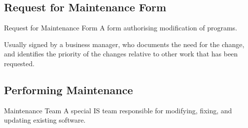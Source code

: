 \documentclass[\main/notes.tex]{subfiles}
\begin{document}
			\subsection{Request for Maintenance Form}
				\begin{definition}{Request for Maintenance Form}
					A form authorising modification of programs.

					Usually signed by a business manager, who documents the need for the change, and identifies the priority of the changes relative to other work that has been requested.
				\end{definition}
			\subsection{Performing Maintenance}
				\begin{definition}{Maintenance Team}
					A special IS team responsible for modifying, fixing, and updating existing software.
				\end{definition}

	\vbox{}
\end{document}
